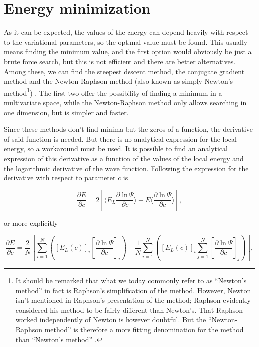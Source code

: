 \section{Energy minimization}
		As it can be expected, the values of the energy can depend heavily with respect to the variational parameters, so the optimal value must be found. This usually means finding the minimum value, and the first option would obviously be just a brute force search, but this is not efficient and there are better alternatives. Among these, we can find the steepest descent method, the conjugate gradient method and the Newton-Raphson method (also known as simply Newton's method\footnote{It should be remarked that what we today commonly refer to as ``Newton's method'' in fact is Raphson's simplification of the method. However, Newton isn't mentioned in Raphson's presentation of the method; Raphson evidently considered  his method to be fairly different than Newton's. That Raphson worked independently of Newton is however doubtful. But the ``Newton-Raphson method'' is therefore a more fitting denomination for the method than ``Newton's method'' \cite{cajori1911}.}) \cite{newton1671} \cite{raphson1702}. The first two offer the possibility of finding a minimum in a multivariate space, while the Newton-Raphson method only allows searching in one dimension, but is simpler and faster.

		Since these methods don't find minima but the zeros of a function, the derivative of said function is needed. But there is no analytical expression for the local energy, so a workaround must be used. It is possible to find an analytical expression of this derivative as a function of the values of the local energy and the logarithmic derivative of the wave function. Following \cite{mortens_notes} the expression for the derivative with respect to parameter $c$ is 

		\begin{equation}
		\frac{\partial E}{\partial c}=2\left[\langle E_L\frac{\partial\ln{\Psi}}{\partial c}\rangle-E\langle\frac{\partial\ln{\Psi}}{\partial c}\rangle\right],
		\end{equation}

		or more explicitly

		\begin{equation}
		\frac{\partial E}{\partial c}=\frac{2}{N}\left[\sum_{i=1}^N\left(\left[E_L\left(c\right)\right]_i\left[\frac{\partial\ln{\Psi}}{\partial c}\right]_i\right)-\frac{1}{N}\sum_{i=1}^N\left(\left[E_L\left(c\right)\right]_i\sum_{j=1}^N\left[\frac{\partial\ln{\Psi}}{\partial c}\right]_j\right)\right],
		\end{equation}

